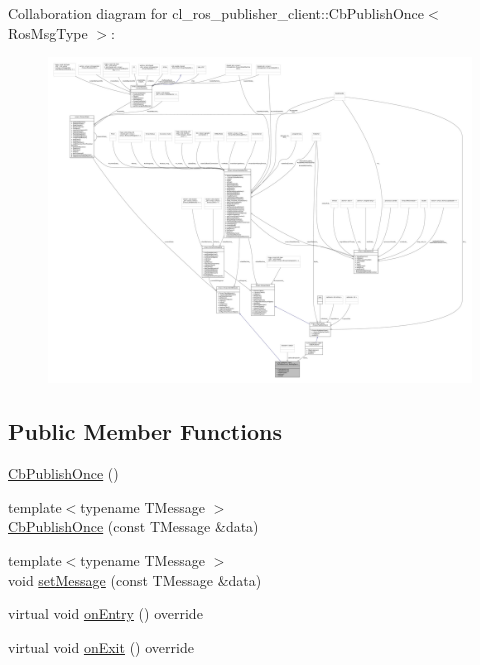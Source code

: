 Collaboration diagram for cl\+\_\+ros\+\_\+publisher\+\_\+client\+:\+:Cb\+Publish\+Once$<$ Ros\+Msg\+Type $>$\+:
\nopagebreak
\begin{figure}[H]
\begin{center}
\leavevmode
\includegraphics[width=350pt]{classcl__ros__publisher__client_1_1CbPublishOnce__coll__graph}
\end{center}
\end{figure}
\subsection*{Public Member Functions}
\begin{DoxyCompactItemize}
\item 
\hyperlink{classcl__ros__publisher__client_1_1CbPublishOnce_ab7cf4acae29049802aadffc81582f025}{Cb\+Publish\+Once} ()
\item 
{\footnotesize template$<$typename T\+Message $>$ }\\\hyperlink{classcl__ros__publisher__client_1_1CbPublishOnce_ab6e1f239d00a2e2895b4136cdfc5a9a4}{Cb\+Publish\+Once} (const T\+Message \&data)
\item 
{\footnotesize template$<$typename T\+Message $>$ }\\void \hyperlink{classcl__ros__publisher__client_1_1CbPublishOnce_a233a6bd514123ab34f44a6d24c2882dc}{set\+Message} (const T\+Message \&data)
\item 
virtual void \hyperlink{classcl__ros__publisher__client_1_1CbPublishOnce_adcd3470b7b73e7030bc97e1aec13773e}{on\+Entry} () override
\item 
virtual void \hyperlink{classcl__ros__publisher__client_1_1CbPublishOnce_a2640b12dbab039c6c62421c81d1d94fd}{on\+Exit} () override
\end{DoxyCompactItemize}
